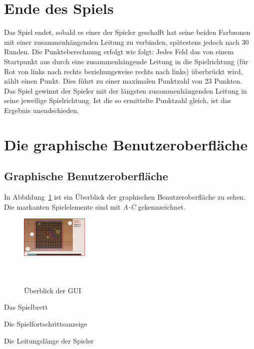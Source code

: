 \documentclass[a4paper, ngerman]{scrartcl}
\begin{document}
\section{Ende des Spiels}

Das Spiel endet, sobald es einer der Spieler geschafft hat seine
beiden Farbzonen mit einer zusammenhängenden Leitung zu verbinden,
spätestens jedoch nach 30 Runden.  Die Punkteberechnung erfolgt wie
folgt: Jedes Feld das von einem Startpunkt aus durch eine
zusammenhängende Leitung in die Spielrichtung (für Rot von links nach
rechts beziehungsweise rechts nach links) überbrückt wird, zählt einen
Punkt. Dies führt zu einer maximalen Punktzahl von 23 Punkten. Das
Spiel gewinnt der Spieler mit der längsten zusammenhängenden Leitung
in seine jeweilige Spielrichtung.  Ist die so ermittelte Punktzahl
gleich, ist das Ergebnis unendschieden.

\section{Die graphische Benutzeroberfläche}

\subsection{Graphische Benutzeroberfläche}

In Abbildung~\ref{fig:GUI} ist ein Überblick der graphischen
Benutzeroberfläche zu sehen. Die markanten Spielelemente sind mit
\emph{A-C} gekennzeichnet.

\begin{figure}[h!]
  \centering
  \includegraphics[scale = 0.6]{bilder/uebersicht.png}
  \caption{Überblick der GUI}
  \label{fig:GUI}
\end{figure}

\begin{compactenum}[A)]
\item Das Spielbrett
\item Die Spielfortschrittsanzeige
\item Die Leitungslänge der Spieler
\end{compactenum}
\end{document}
